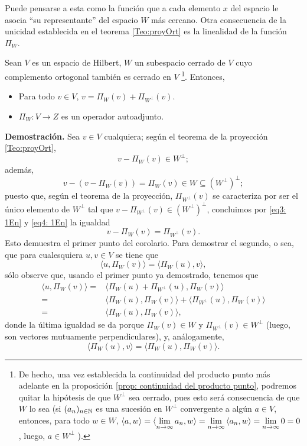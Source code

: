 Puede pensarse a esta como la función que a cada elemento
$x$ del espacio le asocia ``su representante'' del espacio $W$
más cercano. Otra consecuencia de la unicidad establecida en el teorema
\ref{Teo:proyOrt} es la linealidad de la función
$\Pi_{W}$. 

\begin{cor}
Sean $V$ es un espacio de Hilbert, $W$ un subespacio cerrado de 
$V$ cuyo complemento ortogonal también es cerrado en $V$ 
\footnote{De hecho, una vez establecida la continuidad
del producto punto más adelante en la
proposición \ref{prop: continuidad del producto punto}, podremos
quitar la hipótesis de que $W^{\perp}$ sea cerrado, pues esto
será consecuencia de que $W$ lo sea (si $(a_{n})_{n \in \mathbb{N}}$
es una sucesión en $W^{\perp}$ convergente a algún $a \in V$,
entonces, para todo $w \in W$,
$\langle a, w \rangle = 
\langle \lim\limits_{n \rightarrow \infty}{a_{n}}, w \rangle
= \lim\limits_{n \rightarrow \infty}{\langle a_{n},w \rangle}=
\lim\limits_{n \rightarrow \infty}{0}=0$,
luego, $a \in W^{\perp}$ ).}. Entonces,
\begin{itemize}
\item Para todo $v \in V$, $v= \Pi_{W}(v)+ \Pi_{W^{\perp}}(v)$.
\item $\Pi_{W}: V \longrightarrow Z$ es un operador autoadjunto.
\end{itemize}
\end{cor}
\noindent
\textbf{Demostración.}
Sea $v \in V$ cualquiera; según el teorema
de la proyección
\ref{Teo:proyOrt}, 
\begin{equation}
\label{eq3: 1En}
v - \Pi_{W}(v) \in W^{\perp};
\end{equation}
además,
\begin{equation}
\label{eq4: 1En}
v-(v-\Pi_{W}(v))= \Pi_{W}(v) \in W \subseteq (W^{\perp})^{\perp};
\end{equation}
puesto que, según el teorema de la proyección, 
$\Pi_{W^{\perp}}(v)$ se caracteriza por ser el 
único elemento de $W^{\perp}$ tal que 
$v-\Pi_{W^{\perp}}(v) \in (W^{\perp})^{\perp}$,
concluimos por \eqref{eq3: 1En} y \eqref{eq4: 1En}
la igualdad
\[
v-\Pi_{W}(v)= \Pi_{W^{\perp}}(v).
\]
Esto demuestra el primer punto del corolario. Para demostrar
el segundo, o sea, que para cualesquiera
$u, v \in V$ se tiene que
\[
\langle u, \Pi_{W}(v) \rangle = 
\langle \Pi_{W}(u), v \rangle,
\]
sólo observe que,
usando el primer punto ya demostrado, tenemos que
\begin{align*}
\langle u, \Pi_{W}(v) \rangle = & 
\langle \Pi_{W}(u) + \Pi_{W^{\perp}}(u), \Pi_{W}(v) \rangle  \\
= & \langle \Pi_{W}(u), \Pi_{W}(v) \rangle  + 
\langle \Pi_{W^{\perp}}(u), \Pi_{W}(v) \rangle  \\
= & \langle \Pi_{W}(u), \Pi_{W}(v) \rangle  ,
\end{align*}
donde la última igualdad se da porque $\Pi_{W}(v) \in W$ y 
$\Pi_{W^{\perp}}(v) \in W^{\perp}$ (luego,
son vectores mutuamente perpendiculares), y, análogamente,
\[
\langle \Pi_{W}(u), v \rangle  =  
\langle \Pi_{W}(u), \Pi_{W}(v)\rangle .
\]
\QEDB
\vspace{0.2cm}


